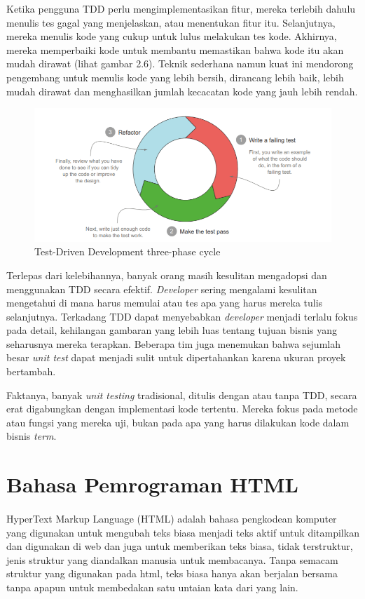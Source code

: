 Ketika pengguna TDD perlu mengimplementasikan fitur, mereka terlebih dahulu menulis tes gagal yang menjelaskan, atau menentukan fitur itu. Selanjutnya, mereka menulis kode yang cukup untuk lulus melakukan tes kode. Akhirnya, mereka memperbaiki kode untuk membantu memastikan bahwa kode itu akan mudah dirawat (lihat gambar 2.6). Teknik sederhana namun kuat ini mendorong pengembang untuk menulis kode yang lebih bersih, dirancang lebih baik, lebih mudah dirawat dan menghasilkan jumlah kecacatan kode yang jauh lebih rendah.

\begin{figure}
	\includegraphics[scale=1.2]{gambar/bdd}
	\centering
	\caption{Test-Driven Development three-phase cycle}
\end{figure}
Terlepas dari kelebihannya, banyak orang masih kesulitan mengadopsi dan menggunakan TDD secara efektif. \textit{Developer} sering mengalami kesulitan mengetahui di mana harus memulai atau tes apa yang harus mereka tulis selanjutnya. Terkadang TDD dapat menyebabkan \textit{developer} menjadi terlalu fokus pada detail, kehilangan gambaran yang lebih luas tentang tujuan bisnis yang seharusnya mereka terapkan. Beberapa tim juga menemukan bahwa sejumlah besar \textit{unit test} dapat menjadi sulit untuk dipertahankan karena ukuran proyek bertambah.

Faktanya, banyak \textit{unit testing} tradisional, ditulis dengan atau tanpa TDD, secara erat digabungkan dengan implementasi kode tertentu. Mereka fokus pada metode atau fungsi yang mereka uji, bukan pada apa yang harus dilakukan kode dalam  bisnis \textit{term}.


\section{Bahasa Pemrograman HTML}
\label{html}
\paragraph{}
HyperText Markup Language (HTML) adalah bahasa pengkodean komputer yang digunakan untuk mengubah teks biasa menjadi teks aktif untuk ditampilkan dan digunakan di web dan juga untuk memberikan teks biasa, tidak terstruktur, jenis struktur yang diandalkan manusia untuk membacanya. Tanpa semacam struktur yang digunakan pada html, teks biasa hanya akan berjalan bersama tanpa apapun untuk membedakan satu untaian kata dari yang lain.

